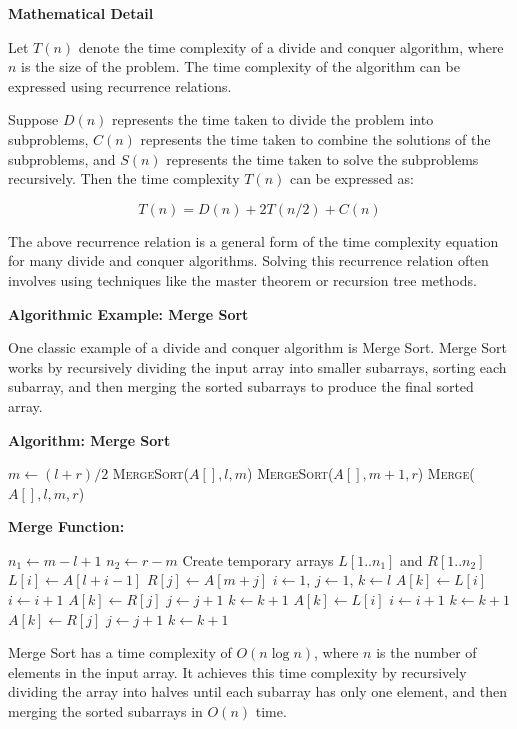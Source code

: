 \documentclass[12pt]{book} %
\begin{document}
\textbf{Mathematical Detail}

Let $T(n)$ denote the time complexity of a divide and conquer algorithm, where $n$ is the size of the problem. The time complexity of the algorithm can be expressed using recurrence relations. 

Suppose $D(n)$ represents the time taken to divide the problem into subproblems, $C(n)$ represents the time taken to combine the solutions of the subproblems, and $S(n)$ represents the time taken to solve the subproblems recursively. Then the time complexity $T(n)$ can be expressed as:

\[
T(n) = D(n) + 2T(n/2) + C(n)
\]

The above recurrence relation is a general form of the time complexity equation for many divide and conquer algorithms. Solving this recurrence relation often involves using techniques like the master theorem or recursion tree methods.

\textbf{Algorithmic Example: Merge Sort}

One classic example of a divide and conquer algorithm is Merge Sort. Merge Sort works by recursively dividing the input array into smaller subarrays, sorting each subarray, and then merging the sorted subarrays to produce the final sorted array.

\textbf{Algorithm: Merge Sort}
\FloatBarrier
\begin{algorithmic}[1]
        \State $m \gets (l + r) / 2$
        \State \textsc{MergeSort}($A[], l, m$) 
        \State \textsc{MergeSort}($A[], m+1, r$) 
        \State \textsc{Merge}($A[], l, m, r$) 
    \EndIf
\EndProcedure
\end{algorithmic}
\FloatBarrier
\textbf{Merge Function:}
\FloatBarrier
\begin{algorithmic}[1]
    \State $n_1 \gets m - l + 1$
    \State $n_2 \gets r - m$
    \State Create temporary arrays $L[1..n_1]$ and $R[1..n_2]$
        \State $L[i] \gets A[l + i - 1]$
    \EndFor
        \State $R[j] \gets A[m + j]$
    \EndFor
    \State $i \gets 1$, $j \gets 1$, $k \gets l$
            \State $A[k] \gets L[i]$
            \State $i \gets i + 1$
        \Else
            \State $A[k] \gets R[j]$
            \State $j \gets j + 1$
        \EndIf
        \State $k \gets k + 1$
    \EndWhile
        \State $A[k] \gets L[i]$
        \State $i \gets i + 1$
        \State $k \gets k + 1$
    \EndWhile
        \State $A[k] \gets R[j]$
        \State $j \gets j + 1$
        \State $k \gets k + 1$
    \EndWhile
\EndProcedure
\end{algorithmic}
\FloatBarrier
Merge Sort has a time complexity of $O(n \log n)$, where $n$ is the number of elements in the input array. It achieves this time complexity by recursively dividing the array into halves until each subarray has only one element, and then merging the sorted subarrays in $O(n)$ time.
\end{document}
